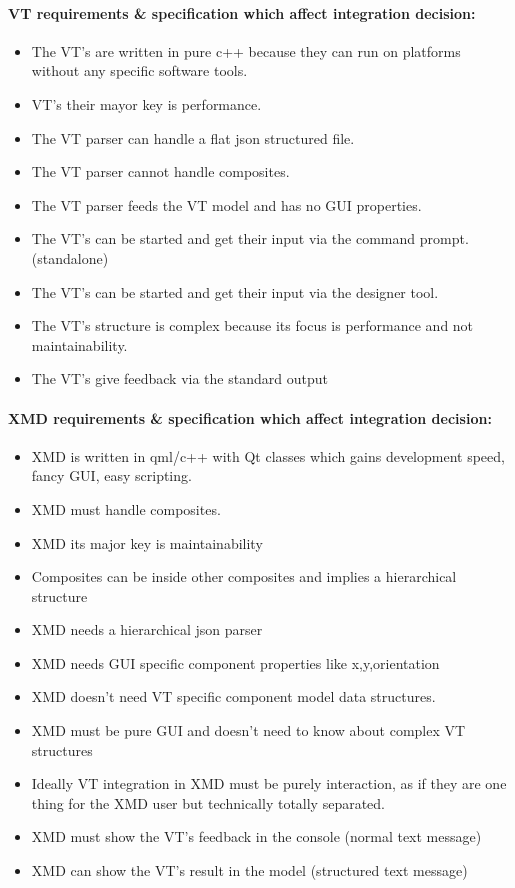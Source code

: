\documentclass[a4paper,11pt,final]{article}
\begin{document}
\paragraph{VT requirements \& specification which affect integration decision:}
\begin{itemize}
\item The VT’s are written in pure c++ because they can run on platforms without any specific software tools.
\item VT’s their mayor key is performance.
\item The VT parser can handle a flat json structured file.
\item The VT parser cannot handle composites.
\item The VT parser feeds the VT model and has no GUI properties.
\item The VT’s can be started and get their input via the command prompt. (standalone)
\item The VT’s can be started and get their input via the designer tool.
\item The VT’s structure is complex because its focus is performance and not maintainability.
\item The VT’s give feedback via the standard output
\end{itemize}

\paragraph{XMD requirements \& specification which affect integration decision:}
\begin{itemize}
\item XMD is written in qml/c++ with Qt classes which gains development speed, fancy GUI, easy scripting.
\item XMD must handle composites.
\item XMD its major key is maintainability
\item Composites can be inside other composites and implies a hierarchical structure
\item XMD needs a hierarchical json parser
\item XMD needs GUI specific component properties like x,y,orientation
\item XMD doesn’t need VT specific component model data structures.
\item XMD must be pure GUI and doesn’t need to know about complex VT structures
\item Ideally VT integration in XMD must be purely interaction,  as if they are one thing for the XMD user but technically totally separated.
\item XMD must show the VT’s feedback in the console (normal text message)
\item XMD can show the VT’s result in the model (structured text message)
\end{itemize}
\end{document}
